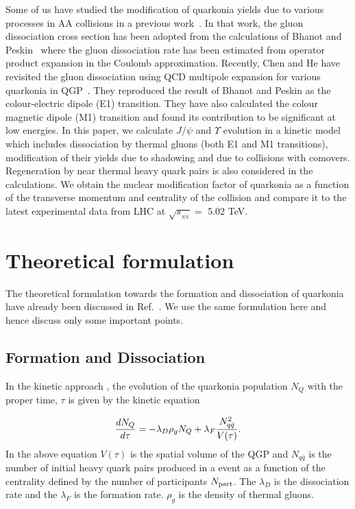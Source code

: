 \documentclass[12pt,a4paper,final]{iopart} %
\newcommand{\Jpsi}{J/\psi}
\newcommand{\sNN}{\sqrt{s_{_{NN}}}}
\begin{document}
 Some of us have studied the modification of quarkonia yields due to various
processes in AA collisions in a previous work~\cite{Kumar:2014kfa}.
In that work, the gluon dissociation cross section has
been adopted from the calculations of Bhanot and Peskin~\cite{Bhanot:1979vb}
where the gluon dissociation rate has been estimated from operator product expansion
in the Coulomb approximation. Recently, Chen and He have revisited the gluon dissociation
using QCD multipole expansion for various quarkonia in QGP~\cite{Chen:2017jje}.
They reproduced the result of Bhanot and Peskin as the colour-electric 
dipole (E1) transition. They have also calculated the colour magnetic
dipole (M1) transition and found its contribution to be significant
at low energies.
 In this paper, we calculate $\Jpsi$ and $\Upsilon$ evolution
in a kinetic model which includes dissociation by thermal gluons
(both E1 and M1 transitions), modification 
of their yields due to shadowing and due to collisions with comovers.
Regeneration by near thermal heavy quark pairs is also considered in the calculations.
We obtain the nuclear modification factor of quarkonia as a function of the
transverse momentum and centrality of the collision and compare it to the latest
experimental data from LHC at $\sNN =$ 5.02 TeV.






\section{Theoretical formulation}

The theoretical formulation towards the formation and dissociation of quarkonia have already been discussed 
in Ref.~\cite{Kumar:2014kfa}. We use the same formulation here and hence discuss only some important points.


\subsection{Formation and Dissociation}


In the kinetic approach \cite{Thews:2000rj}, the evolution of the quarkonia 
population $N_{Q}$ with the proper time, $\tau$ is given by the kinetic equation

\begin{equation}\label{eqkin}
{dN_{Q} \over d\tau}  =  - \lambda_D  \rho_g N_{Q} + \lambda_F {N_{q \bar{q}}^{2} \over V(\tau)}.
\end{equation}
In the above equation $V(\tau)$ is the spatial volume of the QGP  and $N_{q \bar{q}}$ is
the number of initial heavy quark pairs produced in a event as a function of the centrality
defined by the number of participants $N_{\rm part}$. The $\lambda_{D}$ is the dissociation
rate and the $\lambda_{F}$ is the formation rate. $\rho_g$ is the density of thermal gluons.
\end{document}

